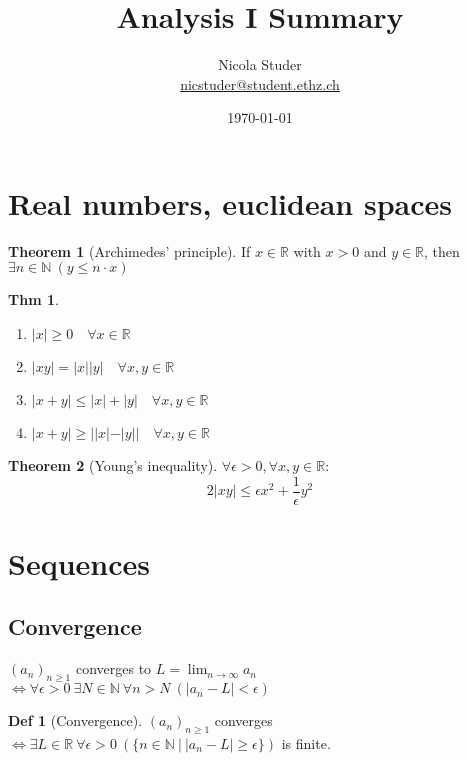 \documentclass[a4paper, 10pt]{article}
\title{Analysis I Summary}
\author{Nicola Studer \\ \href{mailto:nicstuder@student.ethz.ch}{nicstuder@student.ethz.ch}}
\date{\today}
\theoremstyle{definition}
\newtheorem*{theorem}{Thm}
\newtheorem*{definition}{Def}
\theoremstyle{named}
\newtheorem*{ntheorem_wrapper}{Theorem}
\newenvironment{ntheorem}%
    {\begin{mdframed}[style=important]\begin{ntheorem_wrapper}}%
    {\end{ntheorem_wrapper}\end{mdframed}}
\newcommand{\R}{\mathbb{R}}
\newcommand{\N}{\mathbb{N}}
\begin{document}
\maketitle

\section{Real numbers, euclidean spaces}
\begin{ntheorem}[Archimedes' principle]
    If $x \in \R$ with $x > 0$ and $y \in \R$, then $\exists n \in \N \ (y \leq n \cdot x)$
\end{ntheorem}

\begin{theorem}
    \begin{enumerate}[label=(\roman*)]
        \item $|x| \geq 0 \quad \forall x \in \R$
        \item $|xy| = |x||y| \quad \forall x, y \in \R$
        \item $|x + y| \leq |x| + |y| \quad \forall x, y \in \R$
        \item $|x + y| \geq ||x| - |y|| \quad \forall x, y \in \R$
    \end{enumerate}
\end{theorem}

\begin{ntheorem}[Young's inequality]
    $\forall \epsilon > 0, \forall x, y \in \R$:
    $$2 |xy| \leq \epsilon x^2 + \frac{1}{\epsilon} y^2$$
\end{ntheorem}

\section{Sequences}
\subsection{Convergence}
$(a_n)_{n \geq 1}$ converges to $L = \lim_{n \to \infty} a_n$ \\
$\iff \forall \epsilon > 0 \ \exists N \in \N \ \forall n > N \ (|a_n - L | < \epsilon)$

\begin{definition}[Convergence]
    $(a_n)_{n \geq 1}$ converges \\
    $\iff \exists L \in \R  \ \forall \epsilon > 0 \ (\{n \in \N \ | \ |a_n - L| \geq \epsilon \})$ is finite.
\end{definition}
\end{document}
